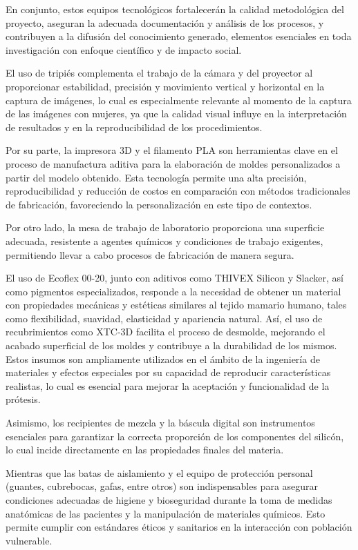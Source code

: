 \documentclass[12pt,a4paper]{article}
\begin{document}
En conjunto, estos equipos tecnológicos fortalecerán la calidad metodológica del proyecto, 
aseguran la adecuada documentación y análisis de los procesos, y contribuyen a la difusión 
del conocimiento generado, elementos esenciales en toda investigación con enfoque científico
y de impacto social.

El uso de tripiés complementa el trabajo de la cámara y del proyector al proporcionar estabilidad,
precisión y movimiento vertical y horizontal en la captura de imágenes, 
lo cual es especialmente relevante al momento de la captura de las imágenes con mujeres,
ya que la calidad visual influye en la interpretación de resultados y en la 
reproducibilidad de los procedimientos.

Por su parte, la impresora 3D  y el filamento PLA son herramientas clave en el proceso de 
manufactura aditiva para la elaboración de moldes personalizados a partir del modelo obtenido.
Esta tecnología permite una alta precisión, reproducibilidad y reducción de costos 
en comparación con métodos tradicionales de fabricación, favoreciendo la personalización en 
este tipo de contextos.

Por otro lado, la mesa de trabajo de laboratorio proporciona una superficie adecuada, 
resistente a agentes químicos y condiciones de trabajo exigentes, permitiendo llevar 
a cabo procesos de fabricación de manera segura.

El uso de Ecoflex 00-20, junto con aditivos como THIVEX Silicon y Slacker, así como
pigmentos especializados, responde a la necesidad de obtener un material con propiedades 
mecánicas y estéticas similares al tejido mamario humano, 
tales como flexibilidad, suavidad, elasticidad y apariencia natural. Así, el uso de 
recubrimientos como XTC-3D facilita el proceso de desmolde, mejorando el acabado 
superficial de los moldes y contribuye a la durabilidad de los mismos.
Estos insumos son ampliamente utilizados en el ámbito de la ingeniería de materiales 
y efectos especiales por su capacidad de reproducir características realistas, 
lo cual es esencial para mejorar la aceptación y funcionalidad de la prótesis.

Asimismo, los recipientes de mezcla y la báscula digital son instrumentos 
esenciales para garantizar la correcta proporción de los componentes del silicón, 
lo cual incide directamente en las propiedades finales del materia. 

Mientras que las batas de aislamiento y el equipo de protección personal (guantes, cubrebocas, gafas, entre otros) 
son indispensables para asegurar condiciones adecuadas de higiene y bioseguridad durante la toma de medidas anatómicas de las pacientes 
y la manipulación de materiales químicos. Esto permite cumplir con estándares éticos y sanitarios en la interacción con población vulnerable.
\end{document}
